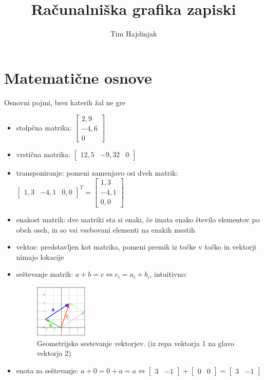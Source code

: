 \documentclass{article}
\title{Računalniška grafika zapiski}
\author{Tim Hajdinjak}
\begin{document}
\maketitle

\section{Matematične osnove}

Osnovni pojmi, brez katerih žal ne gre

\begin{itemize}
\item stolpčna matrika: $\begin{bmatrix} 2,9 \\ -4,6 \\ 0 \end{bmatrix}$
\item vrstična matrika:  $\begin{bmatrix} 12,5 & -9,32 & 0 \end{bmatrix}$
\item transponiranje: pomeni zamenjavo osi dveh matrik: $\begin{bmatrix} 1,3 & -4,1 & 0,0 \end{bmatrix}^T = \begin{bmatrix} 1,3 \\ -4,1 \\ 0,0 \end{bmatrix}$
\item enakost matrik: dve matriki sta si enaki, če imata enako število elementov po obeh oseh, in so vsi vsebovani elementi na enakih mestih
\item vektor: predstavljen kot matrika, pomeni premik iz točke v točko in vektorji nimajo lokacije
\item seštevanje matrik: $a + b = c \iff c_i = a_i + b_i$, intuitivno: 
\begin{figure}[H]
\centering
\includegraphics[width=25mm]{src/sestevanje_vektorjev.png}
\caption{Geometrijsko sestevanje vektorjev. (iz repa vektorja 1 na glavo vektorja 2)}
\end{figure}
\item enota za seštevanje: $a + 0 = 0 + a = a \iff \begin{bmatrix} 3 & -1 \end{bmatrix} + \begin{bmatrix} 0 & 0 \end{bmatrix} = \begin{bmatrix} 3 & -1 \end{bmatrix}$

\end{itemize}
\end{document}
